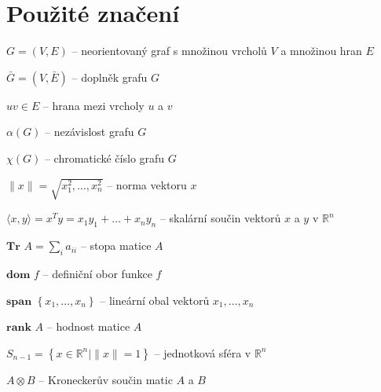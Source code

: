 \chapter*{Použité značení}

\begin{description}
    \item $G=(V,E)$ -- neorientovaný graf s množinou vrcholů $V$ a množinou hran $E$
    \item $\bar{G}=(V,\bar{E})$ -- doplněk grafu $G$
    \item $uv \in E$ -- hrana mezi vrcholy $u$ a $v$
    \item $\alpha(G)$ -- nezávislost grafu $G$
    \item $\chi(G)$ -- chromatické číslo grafu $G$
    \item $\| x \| = \sqrt{x_1^2, \dots, x_n^2}$ -- norma vektoru $x$
    \item $\langle x, y \rangle = x^Ty = x_1y_1 + \dots + x_ny_n$ -- skalární součin vektorů $x$ a $y$ v $\mathbb{R}^n$
    \item $\textbf{Tr }A = \sum_ia_{ii}$ -- stopa matice $A$
    \item $\textbf{dom }f$ -- definiční obor funkce $f$
    \item $\textbf{span }\left\{ x_1, \dots, x_n \right\}$ -- lineární obal vektorů $x_1, \dots, x_n$
    \item $\textbf{rank }A$ -- hodnost matice $A$
    \item $S_{n-1} = \left\{ x \in \mathbb{R}^n \mid \|x\| = 1 \right\}$ -- jednotková sféra v $\mathbb{R}^n$
    \item $A \otimes B$ -- Kroneckerův součin matic $A$ a $B$ 
\end{description}
